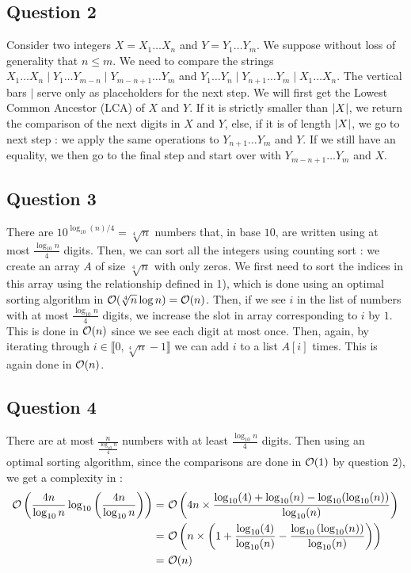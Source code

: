 \documentclass{cours}
\begin{document}
        \subsection{Question 2}
            Consider two integers $X = X_{1}\ldots X_{n}$ and $Y = Y_{1}\ldots Y_{m}$. We suppose without loss of generality that $n \leq m$. We need to compare the strings $X_{1}\ldots X_{n}\mid Y_{1}\ldots Y_{m - n}\mid Y_{m - n + 1}\ldots Y_{m}$ and $Y_{1}\ldots Y_{n}\mid Y_{n + 1}\ldots Y_{m}\mid X_{1}\ldots X_{n}$. The vertical bars $\mid$ serve only as placeholders for the next step. We will first get the Lowest Common Ancestor (LCA) of $X$ and $Y$. If it is strictly smaller than $\left|X\right|$, we return the comparison of the next digits in $X$ and $Y$, else, if it is of length $\left|X\right|$, we go to next step : we apply the same operations to $Y_{n + 1}\ldots Y_{m}$ and $Y$. If we still have an equality, we then go to the final step and start over with $Y_{m - n + 1}\ldots Y_{m}$ and $X$.

        \subsection{Question 3}
            There are $10^{\log_{10}(n)/4} = \sqrt[4]{n}$ numbers that, in base $10$, are written using at most $\frac{\log_{10}n}{4}$ digits. Then, we can sort all the integers using counting sort : we create an array $A$ of size $\sqrt[4]{n}$ with only zeros. We first need to sort the indices in this array using the relationship defined in 1), which is done using an optimal sorting algorithm in $\mathcal{O}(\sqrt[4]{n}\log n) = \mathcal{O}(n)$.
            Then, if we see $i$ in the list of numbers with at most $\frac{\log_{10} n}{4}$ digits, we increase the slot in array corresponding to $i$ by $1$. This is done in $\mathcal{O}(n)$ since we see each digit at most once. Then, again, by iterating through $i \in \llbracket 0, \sqrt[4]{n} - 1 \rrbracket$ we can add $i$ to a list $A[i]$ times. This is again done in $\mathcal{O}(n)$.

        \subsection{Question 4}
            There are at most $\frac{n}{\frac{\log_{10} n}{4}}$ numbers with at least $\frac{\log_{10} n}{4}$ digits. Then using an optimal sorting algorithm, since the comparisons are done in $\mathcal{O}(1)$ by question 2), we get a complexity in :
            \[
                \begin{aligned}
                    \mathcal{O}\left(\frac{4n}{\log_{10}n}\log_{10}\left(\frac{4n}{\log_{10}n}\right)\right) = &\ \mathcal{O}\left(4n\times\frac{\log_{10}(4) + \log_{10}(n) - \log_{10}(\log_{10}(n))}{\log_{10}(n)}\right)\\
                    = &\ \mathcal{O}\left(n\times\left(1 + \frac{\log_{10}(4)}{\log_{10}(n)} - \frac{\log_{10}\left(\log_{10}(n)\right)}{\log_{10}(n)}\right)\right)\\
                    = &\ \mathcal{O}(n)
                \end{aligned}
            \]
\end{document}

